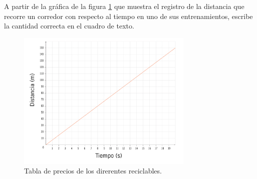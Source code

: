 A partir de la gráfica de la figura \ref{fig:SINMAT1_U3_AC75_IMG2} que muestra el registro de la distancia que recorre un corredor con respecto al tiempo en uno de sus entrenamientos, escribe la cantidad correcta en el cuadro de texto.
\begin{figure}[H]
    \centering
    \includegraphics[width=0.75\textwidth]{../images/SINMAT1_U3_AC75_IMG2.jpg}
    \caption{Tabla de precios de los direrentes reciclables.}
    \label{fig:SINMAT1_U3_AC75_IMG2}
\end{figure}
\begin{parts}
    
    
    
    
    

\end{parts}